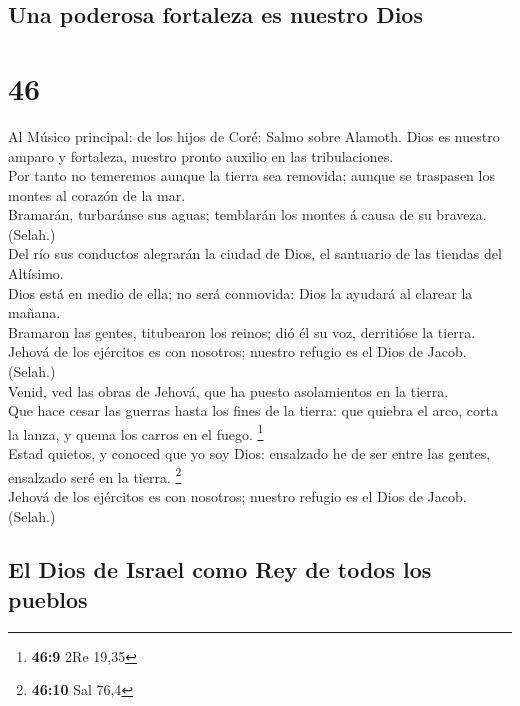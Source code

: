 \hypertarget{una-poderosa-fortaleza-es-nuestro-dios}{%
\subsection{Una poderosa fortaleza es nuestro
Dios}\label{una-poderosa-fortaleza-es-nuestro-dios}}

\hypertarget{section-45}{%
\section{46}\label{section-45}}

 Al Músico principal: de los hijos de Coré: Salmo sobre
Alamoth. Dios es nuestro amparo y fortaleza, nuestro pronto auxilio en
las tribulaciones.\\
 Por tanto no temeremos aunque la tierra sea removida;
aunque se traspasen los montes al corazón de la mar.\\
 Bramarán, turbaránse sus aguas; temblarán los montes á
causa de su braveza. (Selah.)\\
 Del río sus conductos alegrarán la ciudad de Dios, el
santuario de las tiendas del Altísimo.\\
 Dios está en medio de ella; no será conmovida: Dios la
ayudará al clarear la mañana.\\
 Bramaron las gentes, titubearon los reinos; dió él su
voz, derritióse la tierra.\\
 Jehová de los ejércitos es con nosotros; nuestro refugio
es el Dios de Jacob. (Selah.)\\
 Venid, ved las obras de Jehová, que ha puesto
asolamientos en la tierra.\\
 Que hace cesar las guerras hasta los fines de la tierra:
que quiebra el arco, corta la lanza, y quema los carros en el fuego.
\footnote{\textbf{46:9} 2Re 19,35}\\
 Estad quietos, y conoced que yo soy Dios: ensalzado he
de ser entre las gentes, ensalzado seré en la tierra. \footnote{\textbf{46:10}
  Sal 76,4}\\
 Jehová de los ejércitos es con nosotros; nuestro refugio
es el Dios de Jacob. (Selah.)

\hypertarget{el-dios-de-israel-como-rey-de-todos-los-pueblos}{%
\subsection{El Dios de Israel como Rey de todos los
pueblos}\label{el-dios-de-israel-como-rey-de-todos-los-pueblos}}

